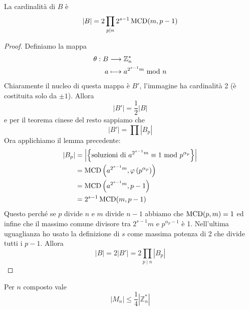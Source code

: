 \begin{lemma}
	La cardinalità di $B$ è 
	\begin{equation*}
	\left|B\right|=2\prod_{p\mid n}2^{s-1}\operatorname{\mathrm{MCD}}(m,p-1)
	\end{equation*}
\end{lemma}
\begin{proof}
	Definiamo la mappa 
	\begin{align*}
	\theta:B&\longrightarrow \mathbb{Z}_n^*\\
	a&\longmapsto a^{2^{s-1}m}\ \mathrm{mod}\ n
	\end{align*}
	Chiaramente il nucleo di questa mappa è $B'$, l'immagine ha cardinalità 2 (è costituita solo da $\pm1$). Allora 
	\begin{equation*}
	\left|B'\right|=\frac{1}{2}\left|B\right|
	\end{equation*}
	e per il teorema cinese del resto sappiamo che
	\begin{equation*}
	\left|B'\right|=\prod\left|B_p\right|
	\end{equation*}
	Ora applichiamo il lemma precedente:
	\begin{align*}
	\left|B_p\right|
	&=\left|\left\{\text{soluzioni di} \ a^{2^{s-1}m}\equiv1\ \mathrm{mod}\ p^{\alpha_p}\right\}\right|\\
	&=\operatorname{\mathrm{MCD}}\left(a^{2^{s-1}m},\varphi\left(p^{\alpha_p}\right)\right)\\
	&=\operatorname{\mathrm{MCD}}\left(a^{2^{s-1}m},p-1\right)\\
	&=2^{s-1}\operatorname{\mathrm{MCD}}(m,p-1)
	\end{align*}
	Questo perché se $p$ divide $n$ e $m$ divide $n-1$ abbiamo che $\operatorname{\mathrm{MCD}}(p,m)=1$ ed infine che il massimo comune divisore tra $2^{s-1}m$ e $p^{\alpha_p-1}$ è 1. Nell'ultima uguaglianza ho usato la definizione di $s$ come massima potenza di 2 che divide tutti i $p-1$. Allora 
	\begin{equation*}
	\left|B\right|=2\left|B'\right|=2\prod_{p\mid n}\left|B_p\right|
	\end{equation*}
\end{proof}
\begin{teorema}
	Per $n$ composto vale 
	\begin{equation*}
	\left|M_n\right|\leq\frac{1}{4}\left|\mathbb{Z}_n^*\right|
	\end{equation*}
\end{teorema}
